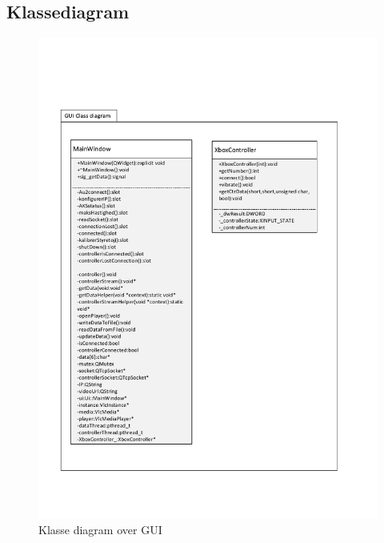 \subsection{Klassediagram}

\begin{figure}[H]
\centering
\includegraphics[width=\textwidth* 9/10]{../fig/diagrammer/pc/gui_classdiagram.pdf}
\caption{Klasse diagram over GUI}
\label{fig:cd_gui}
\end{figure}
